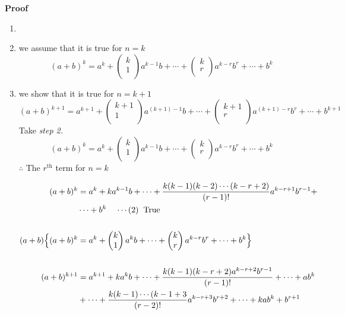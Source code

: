 \documentclass[11pt,a4paper]{article}
\begin{document}
\textbf{Proof}
\begin{enumerate}
\item[\textit{step 1:}]
\item[\textit{step 2:}] we assume that it is true for $n=k$
$$(a+b)^k=a^k+
\begin{pmatrix}
k\\1\\
\end{pmatrix}
a^{k-1}b+\cdots +
\begin{pmatrix}
k\\r\\
\end{pmatrix}
a^{k-r}b^r+\cdots+b^k
$$
\item[\textit{step 3:}] we show that it is true for $n=k+1$
$$(a+b)^{k+1}=a^{k+1}+
\begin{pmatrix}
k+1\\1\\
\end{pmatrix}
a^{(k+1)-1}b+\cdots+
\begin{pmatrix}
k+1\\r\\
\end{pmatrix}
a^{(k+1)-r}b^r+\cdots +b^{k+1}
$$
Take \textit{step 2.}
$$(a+b)^k=a^k+
\begin{pmatrix}
k\\1\\
\end{pmatrix}
a^{k-1}b+\cdots +
\begin{pmatrix}
k\\r\\
\end{pmatrix}
a^{k-r}b^r+\cdots +b^k
$$
$\therefore$  The $r^{\text{th}}$ term for $n=k$


\begin{align*}
(a+b)^k & =  a^k+ka^{k-1}b+\cdots+\frac{k(k-1)(k-2)\cdots(k-r+2)}{(r-1)!}a^{k-r+1}b^{r-1}+\\
        & \cdots+b^k\hspace{0.4cm} \cdots(2)\hspace{0.2cm} \text{True}\\\\
(a+b)\Big\{(a+b)^k &=a^k+
\begin{pmatrix}
k\\1\\
\end{pmatrix}
a^kb+\cdots+
\begin{pmatrix}
k\\r\\
\end{pmatrix}
a^{k-r}b^r+\cdots+b^k\Big\}\\\\
(a+b)^{k+1} &=a^{k+1}+ka^kb+\cdots+\frac{k(k-1)(k-r+2)a^{k-r+2}b^{r-1}}{(r-1)!}+\cdots+ab^k\\
            &+ \cdots+\frac{k(k-1)\cdots (k-1+3}{(r-2)!}a^{k-r+3}b^{r+2}+\cdots+kab^k+b^{r+1}
\end{align*}



\end{enumerate}
\end{document}
